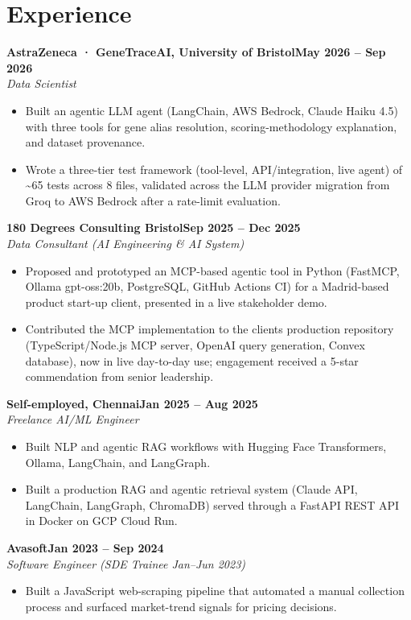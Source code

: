 \documentclass[a4paper,10pt]{article}
\newcommand{\entry}[4]{\noindent\textbf{#1}\hfill\textbf{#2}\\ \textit{#3}\hfill\textit{#4}\par}
\begin{document}
\section{Experience}
\entry{AstraZeneca · GeneTraceAI, University of Bristol}{May 2026 – Sep 2026}{Data Scientist}{}
\begin{itemize}
  \item Built an agentic LLM agent (LangChain, AWS Bedrock, Claude Haiku 4.5) with three tools for gene alias resolution, scoring-methodology explanation, and dataset provenance.
  \item Wrote a three-tier test framework (tool-level, API/integration, live agent) of \textasciitilde{}65 tests across 8 files, validated across the LLM provider migration from Groq to AWS Bedrock after a rate-limit evaluation.
\end{itemize}
\vspace{3pt}
\entry{180 Degrees Consulting Bristol}{Sep 2025 – Dec 2025}{Data Consultant (AI Engineering \& AI System)}{}
\begin{itemize}
  \item Proposed and prototyped an MCP-based agentic tool in Python (FastMCP, Ollama gpt-oss:20b, PostgreSQL, GitHub Actions CI) for a Madrid-based product start-up client, presented in a live stakeholder demo.
  \item Contributed the MCP implementation to the client\textquotesingle{}s production repository (TypeScript/Node.js MCP server, OpenAI query generation, Convex database), now in live day-to-day use; engagement received a 5-star commendation from senior leadership.
\end{itemize}
\vspace{3pt}
\entry{Self-employed, Chennai}{Jan 2025 – Aug 2025}{Freelance AI/ML Engineer}{}
\begin{itemize}
  \item Built NLP and agentic RAG workflows with Hugging Face Transformers, Ollama, LangChain, and LangGraph.
  \item Built a production RAG and agentic retrieval system (Claude API, LangChain, LangGraph, ChromaDB) served through a FastAPI REST API in Docker on GCP Cloud Run.
\end{itemize}
\vspace{3pt}
\entry{Avasoft}{Jan 2023 – Sep 2024}{Software Engineer (SDE Trainee Jan–Jun 2023)}{}
\begin{itemize}
  \item Built a JavaScript web-scraping pipeline that automated a manual collection process and surfaced market-trend signals for pricing decisions.
\end{itemize}
\end{document}
